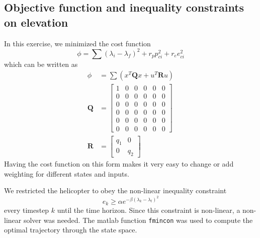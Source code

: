 \subsection{Objective function and inequality constraints on elevation}
In this exercise, we minimized the cost function
\begin{equation}
        \phi =\sum (\lambda_i - \lambda_f)^2 + r_{p}p_{ci}^2 + r_{e}e_{ci}^2
\end{equation}
which can be written as
\begin{subequations}
    \begin{align}
        \phi &= \sum(x^{T}\mathbf{Q}x+u^{T}\mathbf{R}u) \\
        \mathbf{Q} &= \begin{bmatrix}
        1 & 0 & 0 & 0 & 0 & 0         \\
        0 & 0 & 0 & 0 & 0 & 0         \\
        0 & 0 & 0 & 0 & 0 & 0         \\
        0 & 0 & 0 & 0 & 0 & 0         \\
        0 & 0 & 0 & 0 & 0 & 0         \\
        0 & 0 & 0 & 0 & 0 & 0
        \end{bmatrix}\\
        \mathbf{R} &= \begin{bmatrix}
            q_1        & 0        \\
            0          & q_2
        \end{bmatrix}
    \end{align}
\end{subequations}
Having the cost function on this form makes it very easy to change or add weighting for different states and inputs.

We restricted the helicopter to obey the non-linear inequality constraint
\begin{equation}
e_k \geq \alpha e^{-\beta(\lambda_k-\lambda_t)^{2}}
\end{equation}
every timestep $k$ until the time horizon.
Since this constraint is non-linear, a non-linear solver was needed. The matlab function \texttt{fmincon} was used to compute the optimal trajectory through the state space.



